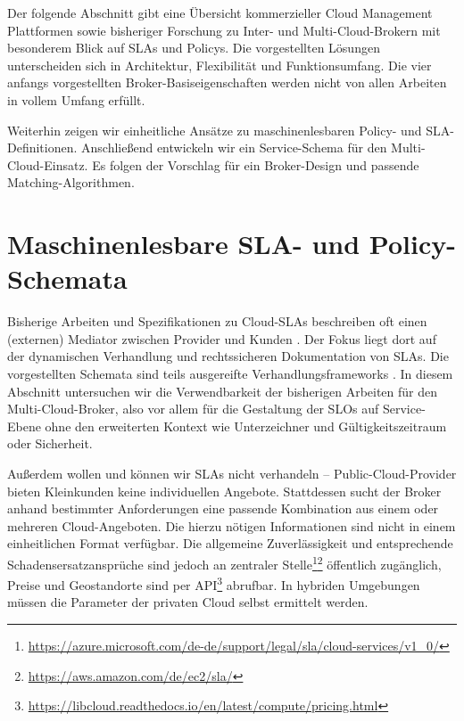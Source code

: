 \noindent
Der folgende Abschnitt gibt eine Übersicht kommerzieller Cloud Management Plattformen sowie bisheriger Forschung zu Inter- und Multi-Cloud-Brokern mit besonderem Blick auf SLAs und Policys. Die vorgestellten Lösungen unterscheiden sich in Architektur, Flexibilität und Funktionsumfang. Die vier anfangs vorgestellten Broker-Basiseigenschaften werden nicht von allen Arbeiten in vollem Umfang erfüllt.

Weiterhin zeigen wir einheitliche Ansätze zu maschinenlesbaren Policy- und SLA-Definitionen. Anschließend entwickeln wir ein Service-Schema für den Multi-Cloud-Einsatz. Es folgen der Vorschlag für ein Broker-Design und passende Matching-Algorithmen.


\section{Maschinenlesbare SLA- und Policy-Schemata}%

Bisherige Arbeiten und Spezifikationen zu Cloud-SLAs beschreiben oft einen (externen) Mediator zwischen Provider und Kunden \cite{stanik:2016:sla-mediation}. Der Fokus liegt dort auf der dynamischen Verhandlung und rechtssicheren Dokumentation von SLAs. Die vorgestellten Schemata sind teils ausgereifte Verhandlungsframeworks \cite{casola:2016:per-service-sla-negotiation}. In diesem Abschnitt untersuchen wir die Verwendbarkeit der bisherigen Arbeiten für den Multi-Cloud-Broker, also vor allem für die Gestaltung der SLOs auf Service-Ebene ohne den erweiterten Kontext wie Unterzeichner und Gültigkeitszeitraum oder Sicherheit.

Außerdem wollen und können wir SLAs nicht verhandeln -- Public-Cloud-Provider bieten Kleinkunden keine individuellen Angebote. Stattdessen sucht der Broker anhand bestimmter Anforderungen eine passende Kombination aus einem oder mehreren Cloud-Angeboten. Die hierzu nötigen Informationen sind nicht in einem einheitlichen Format verfügbar. Die allgemeine Zuverlässigkeit und entsprechende Schadensersatzansprüche sind jedoch an zentraler Stelle\footnote{\url{https://azure.microsoft.com/de-de/support/legal/sla/cloud-services/v1_0/}}\footnote{\url{https://aws.amazon.com/de/ec2/sla/}} öffentlich zugänglich, Preise und Geostandorte sind per API\footnote{\url{https://libcloud.readthedocs.io/en/latest/compute/pricing.html}} abrufbar. In hybriden Umgebungen müssen die Parameter der privaten Cloud selbst ermittelt werden. 

